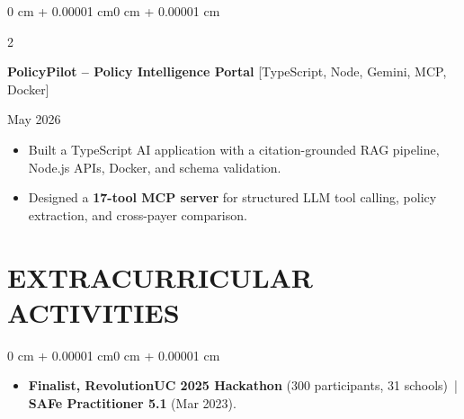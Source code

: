 \documentclass[10pt, letterpaper]{article}
\newenvironment{highlights}{
    \begin{itemize}[
        topsep=0.10 cm,
        parsep=0.06 cm,
        partopsep=0pt,
        itemsep=0.06 cm,
        leftmargin=12pt
    ]
}{
    \end{itemize}
}
\newenvironment{onecolentry}{
    \begin{adjustwidth}{0 cm + 0.00001 cm}{0 cm + 0.00001 cm}
}{
    \end{adjustwidth}
}
\newenvironment{twocolentry}[2][]{
    \onecolentry
    \def\secondColumn{#2}
    \setcolumnwidth{\fill, 4.5 cm}
    \begin{paracol}{2}
}{
    \switchcolumn \raggedleft \secondColumn
    \end{paracol}
    \endonecolentry
}
\begin{document}
\vspace{0.12 cm}

\begin{twocolentry}{May 2026}
\textbf{PolicyPilot -- Policy Intelligence Portal} [TypeScript, Node, Gemini, MCP, Docker]
\end{twocolentry}
\begin{highlights}
  \item Built a TypeScript AI application with a citation-grounded RAG pipeline, Node.js APIs, Docker, and schema validation.
  \item Designed a \textbf{17-tool MCP server} for structured LLM tool calling, policy extraction, and cross-payer comparison.
\end{highlights}

\section{EXTRACURRICULAR ACTIVITIES}
\begin{onecolentry}
\begin{highlights}
  \item \textbf{Finalist, RevolutionUC 2025 Hackathon} (300 participants, 31 schools) \,|\, \textbf{SAFe Practitioner 5.1} (Mar 2023).
\end{highlights}
\end{onecolentry}
\end{document}
